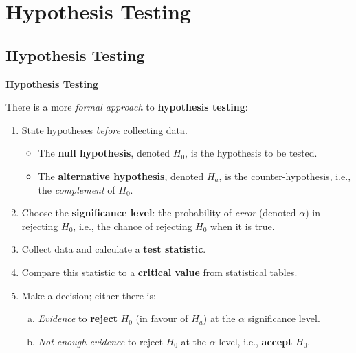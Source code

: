 \documentclass[compress]{beamer}        %
\makeatletter
\newcommand{\tcb}{\textcolor{beamer@blendedblue}}
\makeatother
\begin{document}
\section{Hypothesis Testing}
\subsection{Hypothesis Testing}
\begin{frame}{\bf \tcb{Hypothesis Testing}}

There is a more \emph{formal approach} to {\bf hypothesis testing}:

\begin{enumerate}[1.]\itemsep0.3cm
\item State hypotheses \emph{before} collecting data.\\
    \begin{itemize}\itemsep0.2cm
    \item The {\bf null hypothesis}, denoted {\boldmath$H_0$}, is the hypothesis to be tested.
    \item The {\bf alternative hypothesis}, denoted {\boldmath$H_a$}, is the counter-hypothesis, i.e., the \emph{complement} of $H_0$.
    \end{itemize}
\item Choose the {\bf significance level}: the probability of \emph{error} (denoted {\boldmath$\alpha$}) in rejecting $H_0$, i.e., the chance of rejecting $H_0$ when it is true.
\item Collect data and calculate a {\bf test statistic}.
\item Compare this statistic to a {\bf critical value} from statistical tables.
\item Make a decision; either there is:\\
    \begin{enumerate}[a)]\itemsep0.2cm
    \item \emph{Evidence} to {\bf reject} {\boldmath$H_0$} (in favour of $H_a$) at the $\alpha$ significance level.
    \item \emph{Not enough evidence} to reject $H_0$ at the $\alpha$ level, i.e., {\bf accept} {\boldmath$H_0$}.
    \end{enumerate}
\end{enumerate}


\end{frame}
\end{document}
